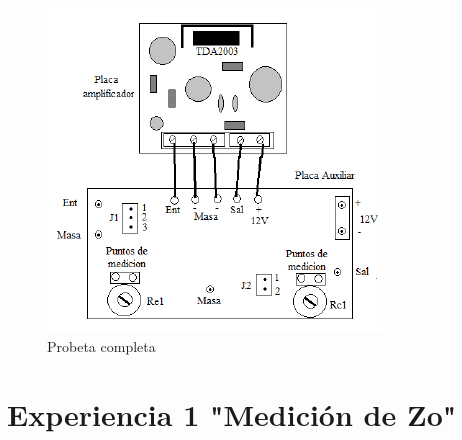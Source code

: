 \documentclass[12pt, letterpaper]{article}
\begin{document}
\begin{figure}[H]
	\centering
	\includegraphics{imagenes/amplificador_placa_aux.png}
	\caption{Probeta completa}
    \label{fig:probeta}
\end{figure}

\section{Experiencia 1 "Medición de Zo"}
\end{document}
